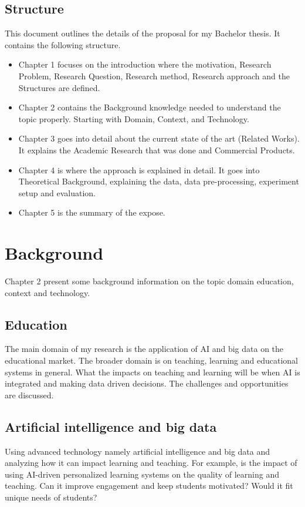 \documentclass{imc-inf}
\begin{document}
\section{Structure}
This document outlines the details of the proposal for my Bachelor thesis. It contains the following structure. 
\begin{itemize}
	\item Chapter 1 focuses on the introduction where the motivation, Research Problem, Research Question, Research method, Research approach and the Structures are defined. 

	\item Chapter 2 contains the Background knowledge needed to understand the topic properly. Starting with Domain, Context, and Technology. 

	\item Chapter 3 goes into detail about the current state of the art (Related Works). It explains the Academic Research that was done and Commercial Products. 

	\item Chapter 4 is where the approach is explained in detail. It goes into Theoretical Background, explaining the data, data pre-processing,  experiment setup and evaluation. 

	 \item Chapter 5 is the summary of the expose. 

\end{itemize}


\chapter{Background}
Chapter 2 present some background information on the topic domain education, context and technology. 
\section{Education }
The main domain of my research is the application of AI and big data on the educational market. The broader domain is on teaching, learning and educational systems in general. What the impacts on teaching and learning will be when AI is integrated and making data driven decisions. The challenges and opportunities are discussed. 

\section{Artificial intelligence and big data }
Using advanced technology namely artificial intelligence and big data and analyzing how it can impact learning and teaching. For example, is the impact of using AI-driven personalized learning systems on the quality of learning and teaching. Can it improve engagement and keep students motivated? Would it fit unique needs of students?
\end{document}
